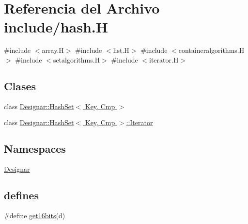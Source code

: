 \hypertarget{hash_8_h}{}\section{Referencia del Archivo include/hash.H}
\label{hash_8_h}
{\ttfamily \#include $<$array.\+H$>$}\newline
{\ttfamily \#include $<$list.\+H$>$}\newline
{\ttfamily \#include $<$containeralgorithms.\+H$>$}\newline
{\ttfamily \#include $<$setalgorithms.\+H$>$}\newline
{\ttfamily \#include $<$iterator.\+H$>$}\newline
\subsection*{Clases}
\begin{DoxyCompactItemize}
\item 
class \hyperlink{class_designar_1_1_hash_set}{Designar\+::\+Hash\+Set$<$ Key, Cmp $>$}
\item 
class \hyperlink{class_designar_1_1_hash_set_1_1_iterator}{Designar\+::\+Hash\+Set$<$ Key, Cmp $>$\+::\+Iterator}
\end{DoxyCompactItemize}
\subsection*{Namespaces}
\begin{DoxyCompactItemize}
\item 
 \hyperlink{namespace_designar}{Designar}
\end{DoxyCompactItemize}
\subsection*{defines}
\begin{DoxyCompactItemize}
\item 
\#define \hyperlink{hash_8_h_abc7d71657be8975a51684e41029b7964}{get16bits}(d)
\end{DoxyCompactItemize}
